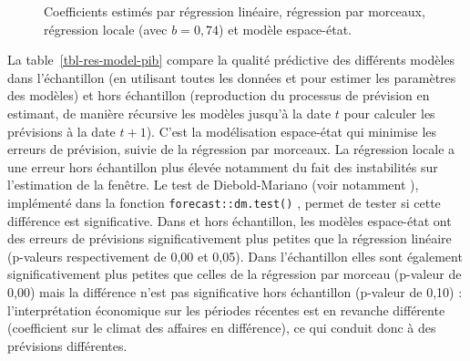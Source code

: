 \documentclass[
  a4paper,
  DIV=11,
  numbers=noendperiod,
  french]{scrartcl}
\newcommand\1{{\mathds 1}}
\theoremstyle{remark}
\begin{document}
\begin{figure}

\caption{\label{fig-coef-ssm}Coefficients estimés par régression
linéaire, régression par morceaux, régression locale (avec \(b=0,74\))
et modèle espace-état.}


\end{figure}%

La table~\ref{tbl-res-model-pib} compare la qualité prédictive des
différents modèles dans l'échantillon (en utilisant toutes les données
et pour estimer les paramètres des modèles) et hors échantillon
(reproduction du processus de prévision en estimant, de manière
récursive les modèles jusqu'à la date \(t\) pour calculer les prévisions
à la date \(t+1\)). C'est la modélisation espace-état qui minimise les
erreurs de prévision, suivie de la régression par morceaux. La
régression locale a une erreur hors échantillon plus élevée notamment du
fait des instabilités sur l'estimation de la fenêtre. Le test de
Diebold-Mariano (voir notamment \textcite{DMtest}), implémenté dans la
fonction \texttt{forecast::dm.test()} \autocite{forecastR}, permet de
tester si cette différence est significative. Dans et hors échantillon,
les modèles espace-état ont des erreurs de prévisions significativement
plus petites que la régression linéaire (p-valeurs respectivement de
0,00 et 0,05). Dans l'échantillon elles sont également significativement
plus petites que celles de la régression par morceau (p-valeur de 0,00)
mais la différence n'est pas significative hors échantillon (p-valeur de
0,10) : l'interprétation économique sur les périodes récentes est en
revanche différente (coefficient sur le climat des affaires en
différence), ce qui conduit donc à des prévisions différentes.
\end{document}
